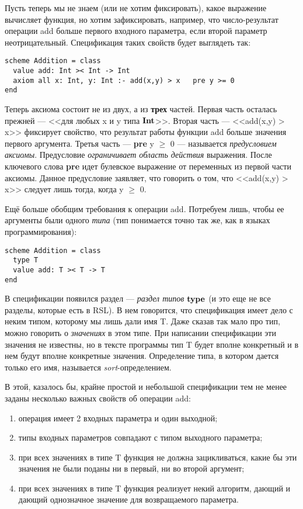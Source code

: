 \documentclass[12pt]{extreport}
\begin{document}
Пусть теперь мы не знаем (или не хотим фиксировать), какое выражение вычисляет функция, но хотим зафиксировать, например, что число-результат операции add больше первого входного параметра, если второй параметр неотрицательный. Спецификация таких свойств будет выглядеть так:

\begin{lstlisting}
scheme Addition = class
  value add: Int >< Int -> Int
  axiom all x: Int, y: Int :- add(x,y) > x   pre y >= 0
end
\end{lstlisting}

Теперь аксиома состоит не из двух, а из \textbf{трех} частей. Первая часть осталась прежней --- <<для любых x и y типа $\textbf{Int}$>>. Вторая часть --- <<add(x,y) > x>> фиксирует свойство, что результат работы функции add больше значения первого аргумента. Третья часть --- \textbf{pre} y $\geq$ 0 --- называется \emph{предусловием аксиомы}. Предусловие \emph{ограничивает область действия} выражения. После ключевого слова \textbf{pre} идет булевское выражение от переменных из первой части аксиомы. Данное предусловие заявляет, что говорить о том, что <<add(x,y) > x>> следует лишь тогда, когда y $\geq$ 0.

Ещё больше обобщим требования к операции add. Потребуем лишь, чтобы ее аргументы были одного \emph{типа} (тип понимается точно так же, как в языках программирования):
\begin{lstlisting}
scheme Addition = class
  type T
  value add: T >< T -> T
end
\end{lstlisting}

В спецификации появился раздел --- \emph{раздел типов} $\textbf{type}$ (и это еще не все разделы, которые есть в RSL). В нем говорится, что спецификация имеет дело с неким типом, которому мы лишь дали имя T. Даже сказав так мало про тип, можно говорить о \emph{значениях} в этом типе. При написании спецификации эти значения не известны, но в тексте программы тип T будет вполне конкретный и в нем будут вполне конкретные значения. Определение типа, в котором дается только его имя, называется \emph{sort}-определением.

В этой, казалось бы, крайне простой и небольшой спецификации тем не менее заданы несколько важных свойств об операции add:
\begin{enumerate}
  \item операция имеет 2 входных параметра и один выходной;
  \item типы входных параметров совпадают с типом выходного параметра;
  \item при всех значениях в типе T функция не должна зацикливаться, какие бы эти значения не были поданы ни в первый, ни во второй аргумент;
  \item при всех значениях в типе T функция реализует некий алгоритм, дающий и дающий однозначное значение для возвращаемого параметра.
\end{enumerate}
\end{document}
